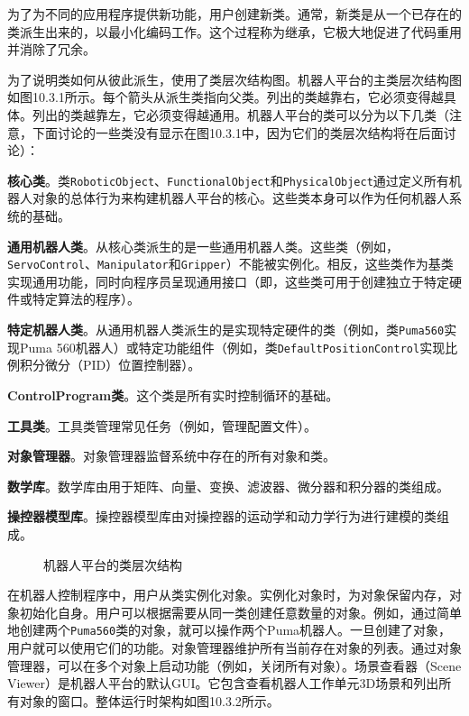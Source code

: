 \documentclass[UTF8,a4paper,12pt]{ctexart}
\begin{document}
为了为不同的应用程序提供新功能，用户创建新类。通常，新类是从一个已存在的类派生出来的，以最小化编码工作。这个过程称为继承，它极大地促进了代码重用并消除了冗余。

为了说明类如何从彼此派生，使用了类层次结构图。机器人平台的主类层次结构图如图10.3.1所示。每个箭头从派生类指向父类。列出的类越靠右，它必须变得越具体。列出的类越靠左，它必须变得越通用。机器人平台的类可以分为以下几类（注意，下面讨论的一些类没有显示在图10.3.1中，因为它们的类层次结构将在后面讨论）：

\textbf{核心类}。类\texttt{RoboticObject}、\texttt{FunctionalObject}和\texttt{PhysicalObject}通过定义所有机器人对象的总体行为来构建机器人平台的核心。这些类本身可以作为任何机器人系统的基础。

\textbf{通用机器人类}。从核心类派生的是一些通用机器人类。这些类（例如，\texttt{ServoControl}、\texttt{Manipulator}和\texttt{Gripper}）不能被实例化。相反，这些类作为基类实现通用功能，同时向程序员呈现通用接口（即，这些类可用于创建独立于特定硬件或特定算法的程序）。

\textbf{特定机器人类}。从通用机器人类派生的是实现特定硬件的类（例如，类\texttt{Puma560}实现Puma 560机器人）或特定功能组件（例如，类\texttt{DefaultPositionControl}实现比例积分微分（PID）位置控制器）。

\textbf{ControlProgram类}。这个类是所有实时控制循环的基础。

\textbf{工具类}。工具类管理常见任务（例如，管理配置文件）。

\textbf{对象管理器}。对象管理器监督系统中存在的所有对象和类。

\textbf{数学库}。数学库由用于矩阵、向量、变换、滤波器、微分器和积分器的类组成。

\textbf{操控器模型库}。操控器模型库由对操控器的运动学和动力学行为进行建模的类组成。

\begin{figure}[htbp]
\centering
{}
\caption{机器人平台的类层次结构}
\label{fig:10.3.1}
\end{figure}

在机器人控制程序中，用户从类实例化对象。实例化对象时，为对象保留内存，对象初始化自身。用户可以根据需要从同一类创建任意数量的对象。例如，通过简单地创建两个\texttt{Puma560}类的对象，就可以操作两个Puma机器人。一旦创建了对象，用户就可以使用它们的功能。对象管理器维护所有当前存在对象的列表。通过对象管理器，可以在多个对象上启动功能（例如，关闭所有对象）。场景查看器（Scene Viewer）是机器人平台的默认GUI。它包含查看机器人工作单元3D场景和列出所有对象的窗口。整体运行时架构如图10.3.2所示。
\end{document}
